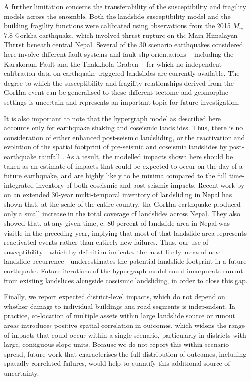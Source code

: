 \documentclass[preprint,12pt,authoryear]{elsarticle}
\begin{document}
A further limitation concerns the transferability of the susceptibility and fragility models across the ensemble. Both the landslide susceptibility model and the building fragility functions were calibrated using observations from the 2015 $M_w$ 7.8 Gorkha earthquake, which involved thrust rupture on the Main Himalayan Thrust beneath central Nepal. Several of the 30 scenario earthquakes considered here involve different fault systems and fault slip orientations -- including the Karakoram Fault and the Thakkhola Graben -- for which no independent calibration data on earthquake-triggered landslides are currently available. The degree to which the susceptibility and fragility relationships derived from the Gorkha event can be generalised to these different tectonic and geomorphic settings is uncertain and represents an important topic for future investigation.

It is also important to note that the hypergraph model as described here accounts only for earthquake shaking and coseismic landslides. Thus, there is no consideration of either enhanced post-seismic landsliding, or the reactivation and evolution of the spatial footprint of pre-seismic and coseismic landslides by post-earthquake rainfall \citep{Kincey2021,Kincey2023,Shrestha2026}. As a result, the modelled impacts shown here should be taken as an estimate of impacts that could be expected to occur on the day of a future earthquake, and are highly likely to be minima compared to the full time-integrated inventory of both coseismic and post-seismic impacts. Recent work by \citet{Harvey2026} on an extended 30-year multi-temporal inventory of landsliding in Nepal has shown that, at the scale of the entire country, the Gorkha earthquake produced only a small increase in the total coverage of landslides across Nepal. They also showed that, at any given time, c. 80 percent of landslide area in Nepal was visible in the preceding year, implying that most of that landslide area represents reactivated events rather than entirely new failures. Thus, our use of susceptibility - which by definition indicates the most likely areas of new landslide occurrence - underestimates the potential landslide footprint in a future earthquake. Future iterations of the hypergraph model could incorporate runout from existing landslides \citep[e.g.,][]{Kincey2023} alongside coseismic landsliding, in order to close this gap.

Finally, we report expected district-level impacts, which do not depend on whether damage to individual buildings and road segments is independent. In practice, co-location of multiple assets within large landslide source or runout areas introduces positive spatial correlation in outcomes, which widens the range of impacts that could occur within a single scenario, particularly in districts with large, contiguous slope units. Because we do not report this within-scenario spread, future work that characterises the full distribution of outcomes, including spatially correlated failures, would help to quantify this additional source of uncertainty.
\end{document}
